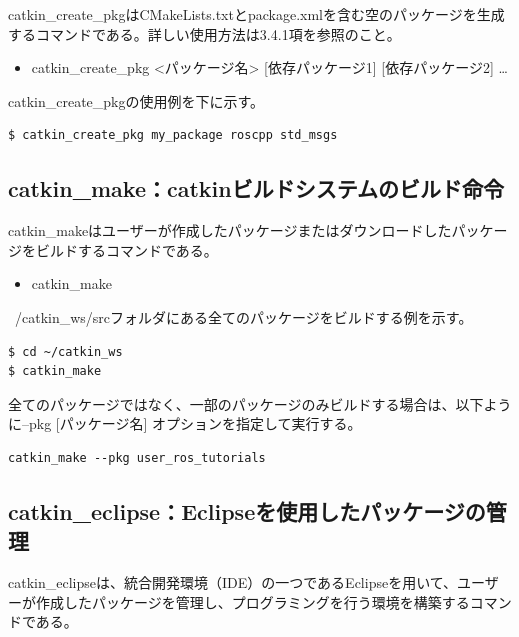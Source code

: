 catkin\_create\_pkgはCMakeLists.txtとpackage.xmlを含む空のパッケージを生成するコマンドである。詳しい使用方法は3.4.1項を参照のこと。

\begin{itemize}
\item catkin\_create\_pkg <パッケージ名> [依存パッケージ1] [依存パッケージ2] …
\end{itemize}

catkin\_create\_pkgの使用例を下に示す。

\begin{lstlisting}[language=ROS]
$ catkin_create_pkg my_package roscpp std_msgs
\end{lstlisting}

\subsection{catkin\_make：catkinビルドシステムのビルド命令}

catkin\_makeはユーザーが作成したパッケージまたはダウンロードしたパッケージをビルドするコマンドである。

\begin{itemize}
\item  catkin\_make
\end{itemize}

~/catkin\_ws/srcフォルダにある全てのパッケージをビルドする例を示す。

\begin{lstlisting}[language=ROS]
$ cd ~/catkin_ws
$ catkin_make
\end{lstlisting}

全てのパッケージではなく、一部のパッケージのみビルドする場合は、以下ように--pkg [パッケージ名] オプションを指定して実行する。

\begin{lstlisting}[language=ROS]
catkin_make --pkg user_ros_tutorials
\end{lstlisting}

\subsection{catkin\_eclipse：Eclipseを使用したパッケージの管理}

catkin\_eclipseは、統合開発環境（IDE）の一つであるEclipseを用いて、ユーザーが作成したパッケージを管理し、プログラミングを行う環境を構築するコマンドである。

